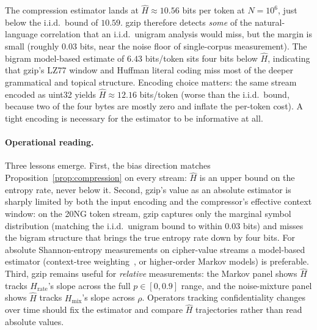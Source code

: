 \documentclass[conference]{IEEEtran}
\theoremstyle{definition}
\theoremstyle{plain}
\theoremstyle{remark}
\begin{document}
The compression estimator lands at $\hat H \approx 10.56$ bits per
token at $N = 10^6$, just below the i.i.d.\ bound of $10.59$.
gzip therefore detects \emph{some} of the natural-language
correlation that an i.i.d.\ unigram analysis would miss, but the
margin is small (roughly $0.03$ bits, near the noise floor of
single-corpus measurement).  The bigram model-based estimate of
$6.43$ bits/token sits four bits below $\hat H$, indicating that
gzip's LZ77 window and Huffman literal coding miss most of the
deeper grammatical and topical structure.  Encoding choice matters:
the same stream encoded as uint32 yields $\hat H \approx 12.16$
bits/token (worse than the i.i.d.\ bound, because two of the four
bytes are mostly zero and inflate the per-token cost).  A tight
encoding is necessary for the estimator to be informative at all.

\paragraph{Operational reading.}
Three lessons emerge.  First, the bias direction matches
Proposition~\ref{prop:compression} on every stream: $\hat H$ is an
upper bound on the entropy rate, never below it.  Second,
gzip's value as an absolute estimator is sharply limited by both
the input encoding and the compressor's effective context window:
on the 20NG token stream, gzip captures only the marginal symbol
distribution (matching the i.i.d.\ unigram bound to within
$0.03$ bits) and misses the bigram structure that brings the true
entropy rate down by four bits.  For absolute Shannon-entropy
measurements on cipher-value streams a model-based estimator
(context-tree weighting~\cite{cover2006elements}, or higher-order
Markov models) is preferable.  Third, gzip remains useful for
\emph{relative} measurements: the Markov panel shows $\hat H$
tracks $H_{\mathrm{rate}}$'s slope across the full
$p \in [0, 0.9]$ range, and the noise-mixture panel shows $\hat H$
tracks $H_{\mathrm{mix}}$'s slope across $\rho$.  Operators
tracking confidentiality changes over time should fix the
estimator and compare $\hat H$ trajectories rather than read
absolute values.
\end{document}
